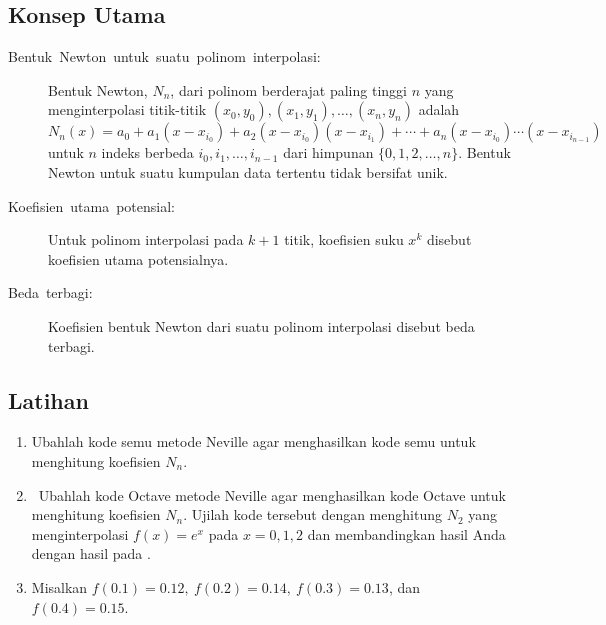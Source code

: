 \noindent\begin{small}

\subsection{Konsep Utama}
\begin{description}
\item [{Bentuk~Newton~untuk~suatu~polinom~interpolasi:}] Bentuk
Newton, $N_{n}$, dari polinom berderajat paling tinggi $n$ yang
menginterpolasi titik-titik $(x_{0},y_{0}),(x_{1},y_{1}),\ldots,(x_{n},y_{n})$
adalah 
\[
N_{n}(x)=a_{0}+a_{1}(x-x_{i_{0}})+a_{2}(x-x_{i_{0}})(x-x_{i_{1}})+\cdots+a_{n}(x-x_{i_{0}})\cdots(x-x_{i_{n-1}})
\]
untuk $n$ indeks berbeda $i_{0},i_{1},\ldots,i_{n-1}$ dari himpunan
$\{0,1,2,\ldots,n\}$. Bentuk Newton untuk suatu kumpulan data tertentu
tidak bersifat unik.
\item [{Koefisien~utama~potensial:}] Untuk
polinom interpolasi pada $k+1$ titik, koefisien suku $x^{k}$ disebut
koefisien utama potensialnya.
\item [{Beda~terbagi:}] Koefisien bentuk Newton dari
suatu polinom interpolasi disebut beda terbagi.
\end{description}

\subsection{Latihan}
\begin{enumerate}
\item Ubahlah kode semu metode Neville 
agar menghasilkan kode semu untuk menghitung koefisien $N_{n}$.
\item \label{exc:interpolation-newton-3}\octave\ Ubahlah kode Octave metode
Neville  agar menghasilkan kode
Octave untuk menghitung koefisien $N_{n}$. Ujilah kode tersebut dengan
menghitung $N_{2}$ yang menginterpolasi $f(x)=e^{x}$ pada $x=0,1,2$
dan membandingkan hasil Anda dengan hasil pada .
\item Misalkan $f(0.1)=0.12,\ f(0.2)=0.14,\ f(0.3)=0.13$, dan $f(0.4)=0.15$.


\end{enumerate}
\end{small}
